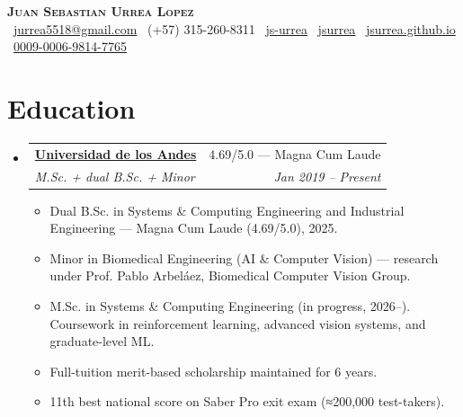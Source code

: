 \documentclass[letterpaper,11pt]{article}
\makeatletter
\newcommand{\cvItem}[1]{
  \item\small{#1 \vspace{-2pt}}
}
\newcommand{\cvEntry}[4]{
  \vspace{-2pt}\item
    \begin{tabular*}{0.97\textwidth}[t]{l@{\extracolsep{\fill}}r}
      \textbf{#1} & \small #3 \\
      \textit{\small#2} & \textit{\small #4} \\
    \end{tabular*}\vspace{-7pt}
}
\newcommand{\cvListStart}{\begin{itemize}[leftmargin=0.15in, label={}]}
\newcommand{\cvListEnd}{\end{itemize}}
\newcommand{\cvItemListStart}{\begin{itemize}[itemsep=-2pt]}
\newcommand{\cvItemListEnd}{\end{itemize}\vspace{-5pt}}
\makeatother
\begin{document}
\begin{center}
  \textbf{\Huge \scshape Juan Sebastian Urrea Lopez} \\ \vspace{4pt}
  \small
  \faEnvelope\ \href{mailto:jurrea5518@gmail.com}{jurrea5518@gmail.com} \quad
  \faPhone\ (+57) 315-260-8311 \quad
  \faLinkedin\ \href{https://www.linkedin.com/in/js-urrea/}{js-urrea} \quad
  \faGithub\ \href{https://github.com/jsurrea}{jsurrea} \quad
  \faGlobe\ \href{https://jsurrea.github.io/}{jsurrea.github.io} \quad
  \faOrcid\ \href{https://orcid.org/0009-0006-9814-7765}{0009-0006-9814-7765}
\end{center}

\section{Education}
\cvListStart
  \cvEntry
    {\href{https://uniandes.edu.co/}{Universidad de los Andes}}
    {M.Sc. + dual B.Sc. + Minor}
    {4.69/5.0 — Magna Cum Laude}
    {Jan 2019 -- Present}
    \cvItemListStart
      \cvItem{Dual B.Sc. in Systems \& Computing Engineering and Industrial Engineering — Magna Cum Laude (4.69/5.0), 2025.}
      \cvItem{Minor in Biomedical Engineering (AI \& Computer Vision) — research under Prof. Pablo Arbeláez, Biomedical Computer Vision Group.}
      \cvItem{M.Sc. in Systems \& Computing Engineering (in progress, 2026–). Coursework in reinforcement learning, advanced vision systems, and graduate-level ML.}
      \cvItem{Full-tuition merit-based scholarship maintained for 6 years.}
      \cvItem{11th best national score on Saber Pro exit exam (≈200,000 test-takers).}
    \cvItemListEnd
\cvListEnd

\end{document}
